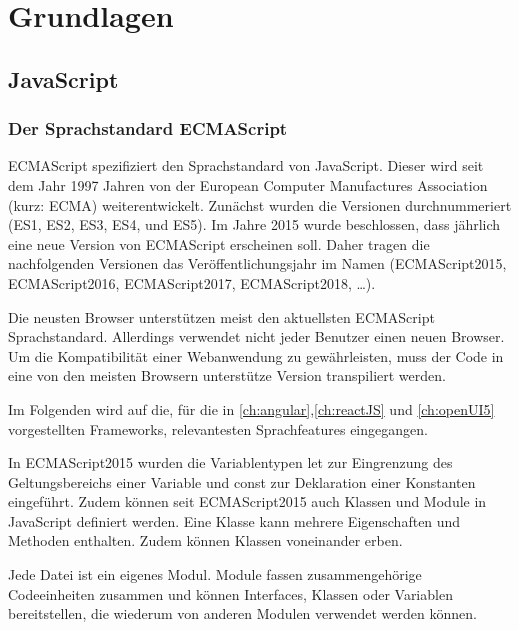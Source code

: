 
\chapter{Grundlagen}

\label{MVC}


\section{JavaScript}

\subsection{Der Sprachstandard ECMAScript}\label{sec:der-sprachstandard-ecmascript}
ECMAScript spezifiziert den Sprachstandard von JavaScript. Dieser wird seit dem Jahr 1997 Jahren von der European Computer Manufactures Association (kurz: ECMA) weiterentwickelt. Zunächst wurden die Versionen durchnummeriert (ES1, ES2, ES3, ES4, und ES5). Im Jahre 2015 wurde beschlossen, dass jährlich eine neue Version von ECMAScript erscheinen soll. Daher tragen die nachfolgenden Versionen das Veröffentlichungsjahr im Namen (ECMAScript2015, ECMAScript2016, ECMAScript2017, ECMAScript2018, …). 

Die neusten Browser unterstützen meist den aktuellsten ECMAScript Sprachstandard. Allerdings verwendet nicht jeder Benutzer einen neuen Browser. Um die Kompatibilität einer Webanwendung zu gewährleisten, muss der Code in eine von den meisten Browsern unterstütze Version transpiliert werden.\autocites[vgl.][27\psqq]{Woiwode.2018}[vgl.][]{Terlson.2018}[vgl.][13\psqq]{Steyer.2017}

Im Folgenden wird auf die, für die in \autoref{ch:angular},\ref{ch:reactJS} und \ref{ch:openUI5} vorgestellten Frameworks, relevantesten Sprachfeatures eingegangen.  

In ECMAScript2015 wurden die Variablentypen let zur Eingrenzung des Geltungsbereichs einer Variable und const zur Deklaration einer Konstanten eingeführt. Zudem können seit ECMAScript2015 auch Klassen und Module in JavaScript definiert werden. Eine Klasse kann mehrere Eigenschaften und Methoden enthalten. Zudem können Klassen voneinander erben.

Jede Datei ist ein eigenes Modul. Module fassen zusammengehörige Codeeinheiten zusammen und können Interfaces, Klassen oder Variablen bereitstellen, die wiederum von anderen Modulen verwendet werden können.\autocites[vgl.][34\psq]{Woiwode.2018}[vgl.][19\psqq]{Steyer.2017}

